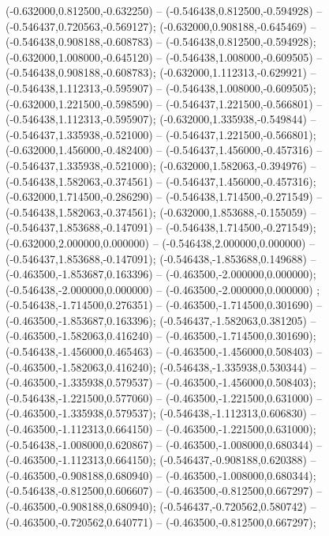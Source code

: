  (-0.632000,0.812500,-0.632250) -- (-0.546438,0.812500,-0.594928) -- (-0.546437,0.720563,-0.569127);
 (-0.632000,0.908188,-0.645469) -- (-0.546438,0.908188,-0.608783) -- (-0.546438,0.812500,-0.594928);
 (-0.632000,1.008000,-0.645120) -- (-0.546438,1.008000,-0.609505) -- (-0.546438,0.908188,-0.608783);
 (-0.632000,1.112313,-0.629921) -- (-0.546438,1.112313,-0.595907) -- (-0.546438,1.008000,-0.609505);
 (-0.632000,1.221500,-0.598590) -- (-0.546437,1.221500,-0.566801) -- (-0.546438,1.112313,-0.595907);
 (-0.632000,1.335938,-0.549844) -- (-0.546437,1.335938,-0.521000) -- (-0.546437,1.221500,-0.566801);
 (-0.632000,1.456000,-0.482400) -- (-0.546437,1.456000,-0.457316) -- (-0.546437,1.335938,-0.521000);
 (-0.632000,1.582063,-0.394976) -- (-0.546438,1.582063,-0.374561) -- (-0.546437,1.456000,-0.457316);
 (-0.632000,1.714500,-0.286290) -- (-0.546438,1.714500,-0.271549) -- (-0.546438,1.582063,-0.374561);
 (-0.632000,1.853688,-0.155059) -- (-0.546437,1.853688,-0.147091) -- (-0.546438,1.714500,-0.271549);
 (-0.632000,2.000000,0.000000) -- (-0.546438,2.000000,0.000000) -- (-0.546437,1.853688,-0.147091);
 (-0.546438,-1.853688,0.149688) -- (-0.463500,-1.853687,0.163396) -- (-0.463500,-2.000000,0.000000);
 (-0.546438,-2.000000,0.000000) -- (-0.463500,-2.000000,0.000000) ;
 (-0.546438,-1.714500,0.276351) -- (-0.463500,-1.714500,0.301690) -- (-0.463500,-1.853687,0.163396);
 (-0.546437,-1.582063,0.381205) -- (-0.463500,-1.582063,0.416240) -- (-0.463500,-1.714500,0.301690);
 (-0.546438,-1.456000,0.465463) -- (-0.463500,-1.456000,0.508403) -- (-0.463500,-1.582063,0.416240);
 (-0.546438,-1.335938,0.530344) -- (-0.463500,-1.335938,0.579537) -- (-0.463500,-1.456000,0.508403);
 (-0.546438,-1.221500,0.577060) -- (-0.463500,-1.221500,0.631000) -- (-0.463500,-1.335938,0.579537);
 (-0.546438,-1.112313,0.606830) -- (-0.463500,-1.112313,0.664150) -- (-0.463500,-1.221500,0.631000);
 (-0.546438,-1.008000,0.620867) -- (-0.463500,-1.008000,0.680344) -- (-0.463500,-1.112313,0.664150);
 (-0.546437,-0.908188,0.620388) -- (-0.463500,-0.908188,0.680940) -- (-0.463500,-1.008000,0.680344);
 (-0.546438,-0.812500,0.606607) -- (-0.463500,-0.812500,0.667297) -- (-0.463500,-0.908188,0.680940);
 (-0.546437,-0.720562,0.580742) -- (-0.463500,-0.720562,0.640771) -- (-0.463500,-0.812500,0.667297);
